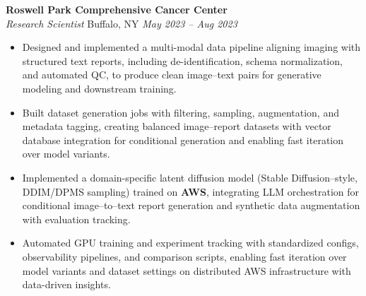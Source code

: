 \vspace*{-1pt}
\item \textbf{Roswell Park Comprehensive Cancer Center}\\
\textit{Research Scientist} \hfill Buffalo, NY \quad \textit{May 2023 -- Aug 2023}
\vspace*{-3pt}
\begin{itemize}[leftmargin=0.2in, topsep=1pt]
  \item Designed and implemented a multi-modal data pipeline aligning imaging with structured text reports, including de-identification, schema normalization, and automated QC, to produce clean image–text pairs for generative modeling and downstream training.
  \item Built dataset generation jobs with filtering, sampling, augmentation, and metadata tagging, creating balanced image–report datasets with vector database integration for conditional generation and enabling fast iteration over model variants.
  \item Implemented a domain-specific latent diffusion model (Stable Diffusion–style, DDIM/DPMS sampling) trained on \textbf{AWS}, integrating LLM orchestration for conditional image–to–text report generation and synthetic data augmentation with evaluation tracking.
  \item Automated GPU training and experiment tracking with standardized configs, observability pipelines, and comparison scripts, enabling fast iteration over model variants and dataset settings on distributed AWS infrastructure with data-driven insights.
\end{itemize}
